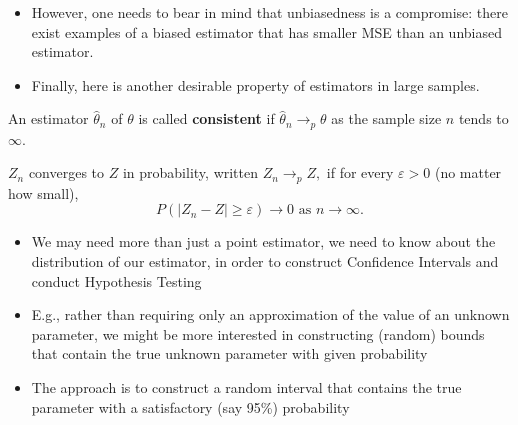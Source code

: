 \documentclass[notes=show]{beamer}
\begin{document}
\begin{frame}%


\begin{itemize}
\item However, one needs to bear in mind that unbiasedness is a compromise:
there exist examples of a biased estimator that has smaller MSE than an
unbiased estimator.

\item Finally, here is another desirable property of estimators in large
samples.
\end{itemize}

\begin{definition}
An estimator $\hat{\theta}_{n}$ of $\theta $ is called \textbf{consistent}
if $\hat{\theta}_{n}\rightarrow _{p}\theta $ as the sample size $n$ tends to 
$\infty $.
\end{definition}

\begin{definition}
$Z_{n}$ converges to $Z$ in probability, written $Z_{n}\rightarrow _{p}Z,$
if for every $\varepsilon >0$ (no matter how small),%
\begin{equation*}
P(|Z_{n}-Z|\geq \varepsilon )\rightarrow 0\text{ as }n\rightarrow \infty .
\end{equation*}
\end{definition}

\end{frame}%

\begin{frame}%


\begin{itemize}
\item We may need more than just a point estimator, we need to know about
the distribution of our estimator, in order to construct Confidence
Intervals and conduct Hypothesis Testing

\item E.g., rather than requiring only an approximation of the value of an
unknown parameter, we might be more interested in constructing (random)
bounds that contain the true unknown parameter with given probability

\item The approach is to construct a random interval that contains the true
parameter with a satisfactory (say 95\%) probability
\end{itemize}

\end{frame}%
\end{document}
